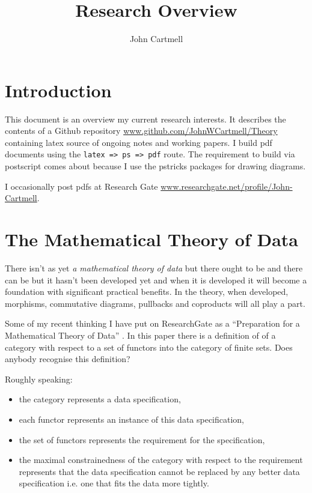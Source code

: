 \documentclass[10pt,a4paper]{article}
\theoremstyle{remark}
\begin{document}
\title{Research Overview}

\author{John Cartmell}

\maketitle


\section{Introduction}

\note This document is an overview my current research interests. It describes the contents of  a Github repository \url{www.github.com/JohnWCartmell/Theory} containing latex source of ongoing notes and working papers. I  build pdf documents using the \verb!latex => ps => pdf! route. The requirement to build via postscript comes about because I use the pstricks packages for drawing diagrams.

\note I occasionally post pdfs at Research Gate \url{www.researchgate.net/profile/John-Cartmell}.

\section{The Mathematical Theory of Data}
\note 
There isn't as yet \textit{a mathematical theory of data} but there ought to be and there can be but it hasn't been developed yet and when it is developed it will become a foundation 
with significant practical benefits. 
In the theory, when developed, morphisms, commutative diagrams, pullbacks and coproducts will all play a part.

Some of my recent thinking I have put on ResearchGate as a ``Preparation for a Mathematical Theory of Data''
\cite{CartmellPreparation}. In this paper there is a definition of  of a category with respect to a set of functors into the category of finite sets. Does anybody recognise this definition? 

Roughly speaking:
\begin{itemize}
\item the category represents a data specification,
\item each functor represents an instance of this data specification,
\item the set of functors represents the requirement for the specification,
\item the maximal constrainedness of the category with respect to the requirement represents that the data specification cannot be replaced by any better data specification i.e. one that fits the data more tightly.
\end{itemize}
\end{document}
